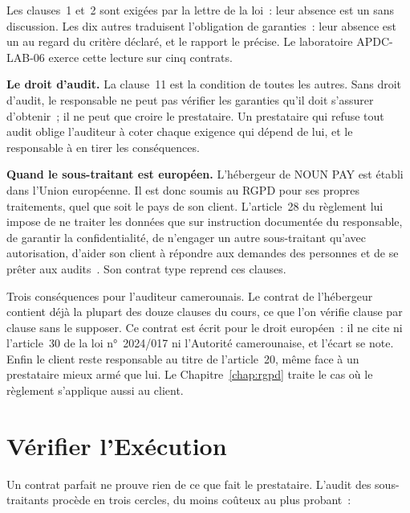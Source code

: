 Les clauses~1 et~2 sont exigées par la lettre de la loi~: leur absence est
un \NON{} sans discussion. Les dix autres traduisent l'obligation de
garanties~: leur absence est un \NON{} au regard du critère déclaré, et le
rapport le précise. Le laboratoire APDC-LAB-06 exerce cette lecture sur
cinq contrats.

\begin{boxinfo}
\textbf{Le droit d'audit.} La clause~11 est la condition de toutes les
autres. Sans droit d'audit, le responsable ne peut pas vérifier les
garanties qu'il doit s'assurer d'obtenir~; il ne peut que croire le
prestataire. Un prestataire qui refuse tout audit oblige l'auditeur à
coter \NEK{} chaque exigence qui dépend de lui, et le responsable à en
tirer les conséquences.
\end{boxinfo}

\begin{boxinfo}
\textbf{Quand le sous-traitant est européen.} L'hébergeur de NOUN PAY est
établi dans l'Union européenne. Il est donc soumis au RGPD pour ses
propres traitements, quel que soit le pays de son client. L'article~28 du
règlement lui impose de ne traiter les données que sur instruction
documentée du responsable, de garantir la confidentialité, de n'engager
un autre sous-traitant qu'avec autorisation, d'aider son client à
répondre aux demandes des personnes et de se prêter aux
audits~\cite{ue2016rgpd}. Son contrat type reprend ces clauses.

\smallskip
Trois conséquences pour l'auditeur camerounais. Le contrat de l'hébergeur
contient déjà la plupart des douze clauses du cours, ce que l'on vérifie
clause par clause sans le supposer. Ce contrat est écrit pour le droit
européen~: il ne cite ni l'article~30 de la loi n°~2024/017 ni
l'Autorité camerounaise, et l'écart se note. Enfin le client reste
responsable au titre de l'article~20, même face à un prestataire mieux
armé que lui. Le Chapitre~\ref{chap:rgpd} traite le cas où le règlement
s'applique aussi au client.
\end{boxinfo}

\section{Vérifier l'Exécution}
\label{sec:c10-execution}

Un contrat parfait ne prouve rien de ce que fait le prestataire. L'audit des
sous-traitants procède en trois cercles, du moins coûteux au plus probant~:

